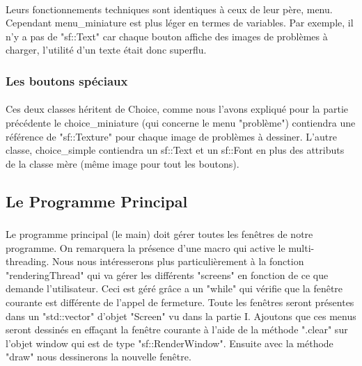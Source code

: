     	        \paragraph{}Leurs fonctionnements techniques sont identiques à ceux de leur père, menu. Cependant menu\_miniature est plus léger en termes de variables. Par exemple, il n'y a pas de "sf::Text" car chaque bouton affiche des images de problèmes à charger, l'utilité d'un texte était donc superflu. 
    	       
    	   \subsubsection{Les boutons spéciaux}
                \paragraph{}Ces deux classes héritent de Choice, comme nous l'avons expliqué pour la partie précédente le choice\_miniature (qui concerne le menu "problème") contiendra une référence de "sf::Texture" pour chaque image de problèmes à dessiner. L'autre classe, choice\_simple contiendra un sf::Text et un sf::Font en plus des attributs de la classe mère (même image pour tout les boutons).
        
        
        \subsection{Le Programme Principal}
            \subsubsection{}
                \paragraph{}Le programme principal (le main) doit gérer toutes les fenêtres de notre programme. On remarquera la présence d'une macro qui active le multi-threading. Nous nous intéresserons plus particulièrement à la fonction "renderingThread" qui va gérer les différents "screens" en fonction de ce que demande l'utilisateur. Ceci est géré grâce a un "while" qui vérifie que la fenêtre courante est différente de l'appel de fermeture. Toute les fenêtres seront présentes dans un "std::vector" d'objet "Screen" vu dans la partie I. Ajoutons que ces menus seront dessinés en effaçant la fenêtre courante à l'aide de la méthode ".clear" sur l'objet window qui est de type "sf::RenderWindow". Ensuite avec la méthode "draw" nous dessinerons la nouvelle fenêtre.
                
